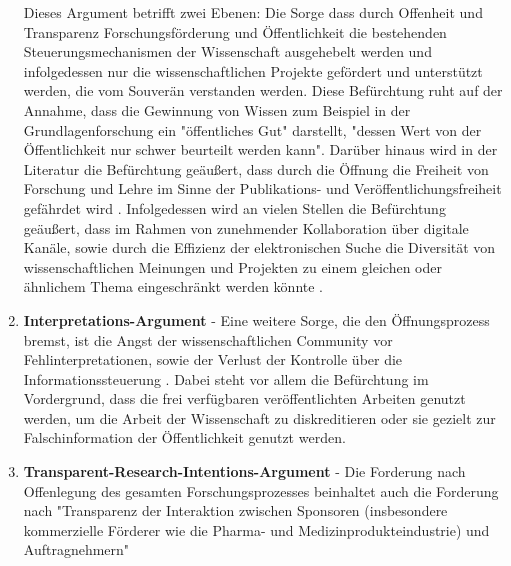 \begin{enumerate}
Dieses Argument betrifft zwei Ebenen: Die Sorge dass durch Offenheit und Transparenz Forschungsförderung und Öffentlichkeit die bestehenden Steuerungsmechanismen der Wissenschaft ausgehebelt werden und infolgedessen nur die wissenschaftlichen Projekte gefördert und unterstützt werden, die vom Souverän verstanden werden. Diese Befürchtung ruht auf der Annahme, dass die Gewinnung von Wissen zum Beispiel in der Grundlagenforschung ein "öffentliches Gut" darstellt, "dessen Wert von der Öffentlichkeit nur schwer beurteilt werden kann"\cite{osterloh2008anreize}. Darüber hinaus wird in der Literatur die Befürchtung geäußert, dass durch die Öffnung die Freiheit von Forschung und Lehre im Sinne der Publikations- und Veröffentlichungsfreiheit gefährdet wird \cite{Jochum_2009}. Infolgedessen wird an vielen Stellen die Befürchtung geäußert, dass im Rahmen von zunehmender Kollaboration über digitale Kanäle, sowie durch die Effizienz der elektronischen Suche die Diversität von wissenschaftlichen Meinungen und Projekten zu einem gleichen oder ähnlichem Thema eingeschränkt werden könnte \cite{Evans_2008}.
\item \textbf{Interpretations-Argument} - Eine weitere Sorge, die den Öffnungsprozess bremst, ist die Angst der wissenschaftlichen Community vor  Fehlinterpretationen, sowie der Verlust der Kontrolle über die Informationssteuerung \cite{gibbons_1994}. Dabei steht vor allem die Befürchtung im Vordergrund, dass die frei verfügbaren veröffentlichten Arbeiten genutzt werden, um die Arbeit der Wissenschaft zu diskreditieren oder sie gezielt zur Falschinformation der Öffentlichkeit genutzt werden.
\item \textbf{Transparent-Research-Intentions-Argument} - Die Forderung nach Offenlegung des gesamten Forschungsprozesses beinhaltet auch die Forderung nach "Transparenz der Interaktion zwischen Sponsoren (insbesondere kommerzielle Förderer wie die Pharma- und Medizinprodukteindustrie) und Auftragnehmern" \cite{Stengel_2013}
\end{enumerate}
